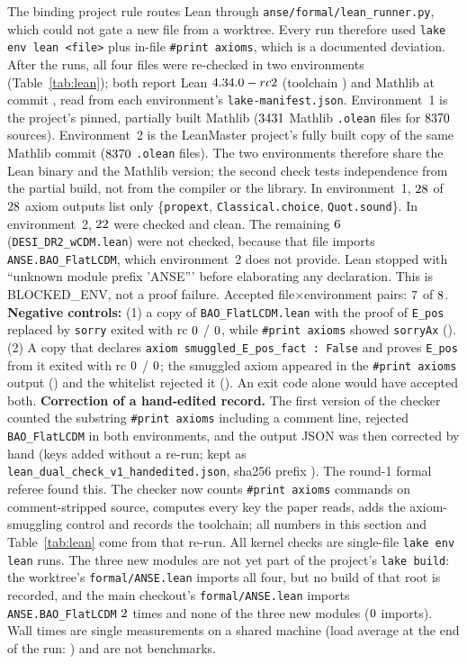 \documentclass[11pt]{article}
\begin{document}
The binding project rule routes Lean through \texttt{anse/formal/lean\_runner.py}, which could not gate a new file from a worktree. Every
run therefore used \texttt{lake env lean <file>} plus in-file \texttt{\#print axioms}, which is a documented deviation. After the runs,
all four files were re-checked in two environments (Table~\ref{tab:lean}); both report Lean $4.34.0-rc2$ (toolchain \texttt{\lnToolchain}) and
Mathlib \texttt{\lnMathlibInput} at commit \texttt{\lnMathlibRev}, read from each environment's \texttt{lake-manifest.json}. Environment~1 is the
project's pinned, partially built Mathlib ($3431$ Mathlib \texttt{.olean} files for $8370$ sources). Environment~2 is the LeanMaster project's fully built copy of the same
Mathlib commit ($8370$ \texttt{.olean} files). The two environments therefore share the Lean binary and the Mathlib version; the second check tests independence from the
partial build, not from the compiler or the library. In environment~1, $28$ of
$28$ axiom outputs list only \{\texttt{propext}, \texttt{Classical.choice}, \texttt{Quot.sound}\}. In environment~2,
$22$ were checked and clean. The remaining $6$ (\texttt{DESI\_DR2\_wCDM.lean}) were not checked, because that file
imports \texttt{ANSE.BAO\_FlatLCDM}, which environment~2 does not provide. Lean stopped with ``unknown module prefix 'ANSE''' before
elaborating any declaration. This is BLOCKED\_ENV, not a proof failure. Accepted file$\times$environment pairs: $7$ of $8$.
\textbf{Negative controls:} (1) a copy of \texttt{BAO\_FlatLCDM.lean} with the proof of \texttt{E\_pos} replaced by \texttt{sorry} exited
with rc $0$ / $0$, while \texttt{\#print axioms} showed \texttt{sorryAx} (\lnNegSorry). (2) A copy that declares
\texttt{axiom smuggled\_E\_pos\_fact : False} and proves \texttt{E\_pos} from it exited with rc $0$ / $0$; the smuggled axiom
appeared in the \texttt{\#print axioms} output (\lnAxSeen) and the whitelist rejected it (\lnAxRejected). An exit code alone would have accepted both.
\textbf{Correction of a hand-edited record.} The first version of the checker counted the substring \texttt{\#print axioms} including a comment line,
rejected \texttt{BAO\_FlatLCDM} in both environments, and the output JSON was then corrected by hand (keys added without a re-run; kept as
\texttt{lean\_dual\_check\_v1\_handedited.json}, sha256 prefix \texttt{\lnVoneSha}). The round-1 formal referee found this. The checker now counts
\texttt{\#print axioms} commands on comment-stripped source, computes every key the paper reads, adds the axiom-smuggling control and records the
toolchain; all numbers in this section and Table~\ref{tab:lean} come from that re-run. All kernel checks are single-file \texttt{lake env lean} runs. The three new
modules are not yet part of the project's \texttt{lake build}: the worktree's \texttt{formal/ANSE.lean} imports all four, but no build of that root is recorded, and the main
checkout's \texttt{formal/ANSE.lean} imports \texttt{ANSE.BAO\_FlatLCDM} $2$ times and none of the three new modules ($0$ imports). Wall times are single measurements on a shared machine
(load average at the end of the run: \lnLoad) and are not benchmarks.
\end{document}
